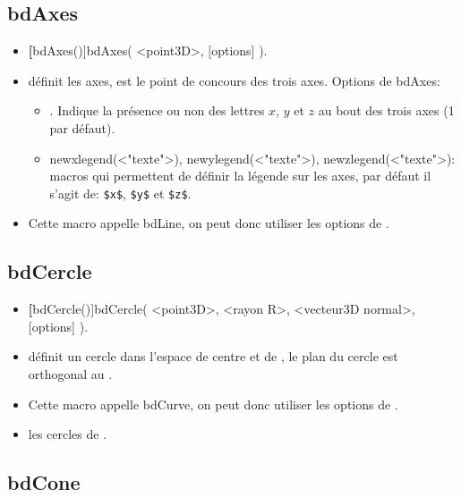 \subsection{bdAxes}

\begin{itemize}
 \item \util \textbf[bdAxes()]{bdAxes( <point3D>, [options] )}.
 \item \desc définit les axes,  est le point de concours des trois axes. Options de bdAxes: 

  \begin{itemize}
  \item {}. Indique la présence ou non des lettres $x$, $y$ et $z$ au bout des trois axes (1 par défaut).
  \item \textcolor{\coloropt}{newxlegend(<"texte">)}, \textcolor{\coloropt}{newylegend(<"texte">)}, \textcolor{\coloropt}{newzlegend(<"texte">)}: macros qui permettent de définir la légende sur les axes, par défaut il s'agit de: \verb|$x$|, \verb|$y$| et \verb|$z$|.
  \end{itemize}
 \item Cette macro appelle bdLine, on peut donc utiliser les options de .
\end{itemize}

\subsection{bdCercle}

\begin{itemize}
 \item \util \textbf[bdCercle()]{bdCercle( <point3D>, <rayon R>, <vecteur3D normal>, [options] )}.
 \item \desc définit un cercle dans l'espace de centre  et de , le plan du cercle est orthogonal au . 
 \item Cette macro appelle bdCurve, on peut donc utiliser les options de .
 \item \exem les cercles de .
\end{itemize}


\subsection{bdCone}

